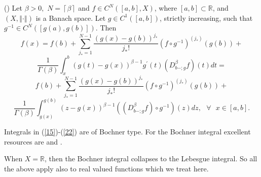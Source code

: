 \documentclass[10pt]{NSP1}
\numberwithin{equation}{section}
\begin{document}
\begin{theorem}
\label{t7}(\cite{5}) Let $\beta >0,$ $N=\left \lceil \beta \right \rceil $
and $f\in C^{N}\left( \left[ a,b\right] ,X\right) $, where $\left[ a,b\right]
\subset \mathbb{R}$, and $\left( X,\left \Vert \cdot \right \Vert \right) $
is a Banach space. Let $g\in C^{1}\left( \left[ a,b\right] \right) $,
strictly increasing, such that $g^{-1}\in C^{N}\left( \left[ g\left(
a\right) ,g\left( b\right) \right] \right) .$ Then
\begin{equation*}
f\left( x\right) =f\left( b\right) +\sum_{j_{\ast }=1}^{N-1}\frac{\left(
g\left( x\right) -g\left( b\right) \right) ^{j_{\ast }}}{j_{\ast }!}\left(
f\circ g^{-1}\right) ^{\left( j_{\ast }\right) }\left( g\left( b\right)
\right) +
\end{equation*}
\begin{equation*}
\frac{1}{\Gamma \left( \beta \right) }\int_{x}^{b}\left( g\left( t\right)
-g\left( x\right) \right) ^{\beta -1}g^{\prime }\left( t\right) \left(
D_{b-;g}^{\beta }f\right) \left( t\right) dt=
\end{equation*}
\begin{equation}
f\left( b\right) +\sum_{j_{\ast }=1}^{N-1}\frac{\left( g\left( x\right)
-g\left( b\right) \right) ^{j_{\ast }}}{j_{\ast }!}\left( f\circ
g^{-1}\right) ^{\left( j_{\ast }\right) }\left( g\left( b\right) \right) +
\tag{22}  \label{22}
\end{equation}
\begin{equation*}
\frac{1}{\Gamma \left( \beta \right) }\int_{g\left( x\right) }^{g\left(
b\right) }\left( z-g\left( x\right) \right) ^{\beta -1}\left( \left(
D_{b-;g}^{\beta }f\right) \circ g^{-1}\right) \left( z\right) dz,\text{ \ }%
\forall \text{ }x\in \left[ a,b\right] .
\end{equation*}
\end{theorem}

Integrals in (\ref{15})-(\ref{22}) are of Bochner type. For the Bochner
integral excellent resources are \cite{17} and \cite[pp. 422-428]{1}.

When $X=\mathbb{R}$, then the Bochner integral collapses to the Lebesgue
integral. So all the above apply also to real valued functions which we
treat here.
\end{document}
